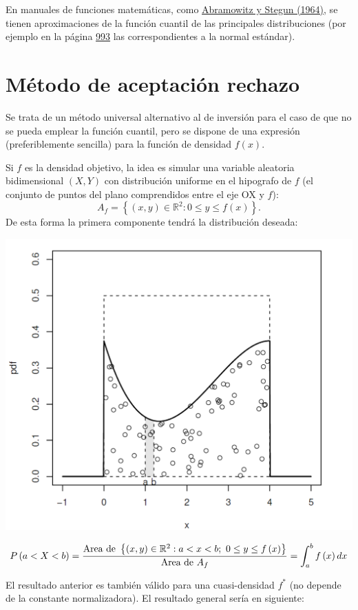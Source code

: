 \documentclass[]{book}
\theoremstyle{definition}
\theoremstyle{definition}
\theoremstyle{definition}
\theoremstyle{remark}
\begin{document}
En manuales de funciones matemáticas, como
\href{http://people.math.sfu.ca/~cbm/aands/}{Abramowitz y Stegun
(1964)}, se tienen aproximaciones de la función cuantil de las
principales distribuciones (por ejemplo en la página
\href{http://people.math.sfu.ca/~cbm/aands/page_933.htm}{993} las
correspondientes a la normal estándar).

\section{Método de aceptación
rechazo}\label{metodo-de-aceptacion-rechazo}

Se trata de un método universal alternativo al de inversión para el caso
de que no se pueda emplear la función cuantil, pero se dispone de una
expresión (preferiblemente sencilla) para la función de densidad
\(f\left( x \right)\).

Si \(f\) es la densidad objetivo, la idea es simular una variable
aleatoria bidimensional \(\left( X, Y\right)\) con distribución uniforme
en el hipografo de \(f\) (el conjunto de puntos del plano comprendidos
entre el eje OX y \(f\)):
\[A_{f}=\left\{ \left( x,y\right) \in \mathbb{R}^{2}:0\leq y\leq
f\left( x\right) \right\}.\] De esta forma la primera componente tendrá
la distribución deseada:

\begin{center}\includegraphics[width=0.7\linewidth]{images/rechazo} \end{center}

\[ P\left( a<X<b\right) = \frac{\text{Area de }\left\{ \left( x,y\right) \in 
\mathbb{R}^{2}:a<x<b;~0\leq y\leq f\left( x\right) \right\} }{\text{Area de }
A_{f}} \\
= \int_{a}^{b}f\left( x\right) dx \]

El resultado anterior es también válido para una cuasi-densidad
\(f^{\ast}\) (no depende de la constante normalizadora). El resultado
general sería en siguiente:
\end{document}
